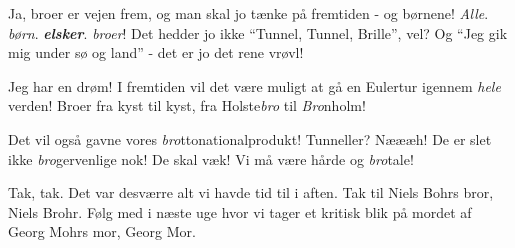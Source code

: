 \documentclass[a4paper,11pt]{article}
\begin{document}
\begin{sketch}
    Ja, broer er vejen frem, og man skal jo tænke på fremtiden - og børnene!
    \emph{Alle}. \emph{børn}. \emph{\bf elsker}. \emph{broer}!
    Det hedder jo ikke ``Tunnel, Tunnel, Brille'', vel?
    Og ``Jeg gik mig under sø og land'' - det er jo det rene vrøvl!

    Jeg har en drøm! I fremtiden vil det være muligt at gå en Eulertur igennem
    \emph{hele} verden! Broer fra kyst til kyst, fra Holste\emph{bro} til \emph{Bro}nholm!

    Det vil også gavne vores \emph{bro}ttonationalprodukt!
    Tunneller? Næææh! De er slet ikke \emph{bro}gervenlige nok!
    De skal væk! Vi må være hårde og \emph{bro}tale!


 Tak, tak. Det var desværre alt vi havde tid til i aften.
         Tak til Niels Bohrs bror, Niels Brohr.
         Følg med i næste uge hvor vi tager et kritisk blik på mordet af Georg Mohrs mor, Georg Mor.


\end{sketch}
\end{document}
